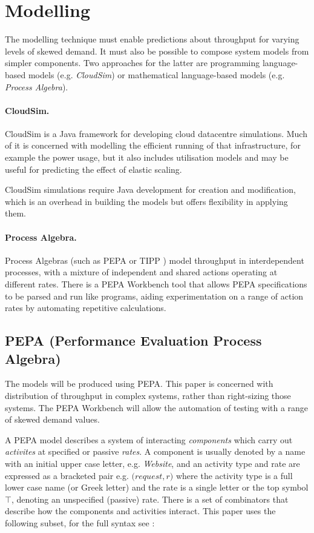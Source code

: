 \section{Modelling}

The modelling technique must enable predictions about throughput for varying levels of skewed demand.  It must also be possible to compose system models from simpler components.  Two approaches for the latter are programming language-based models (e.g. {\itshape CloudSim}) or mathematical language-based models (e.g. {\itshape Process Algebra}).

\paragraph{CloudSim.}  CloudSim \cite{RN69} is a Java framework for developing cloud datacentre simulations.  Much of it is concerned with modelling the efficient running of that infrastructure, for example the power usage, but it also includes utilisation models and may be useful for predicting the effect of elastic scaling.

CloudSim simulations require Java development for creation and modification, which is an overhead in building the models but offers flexibility in applying them.

\paragraph{Process Algebra.} Process Algebras (such as PEPA or TIPP \cite{RN64}) model throughput in interdependent processes, with a mixture of independent and shared actions operating at different rates.  There is a PEPA Workbench tool \cite{RN51} that allows PEPA specifications to be parsed and run like programs, aiding experimentation on a range of action rates by automating repetitive calculations.

\subsection{PEPA (Performance Evaluation Process Algebra)}

The models will be produced using PEPA.  This paper is concerned with distribution of throughput in complex systems, rather than right-sizing those systems.  The PEPA Workbench will allow the automation of testing with a range of skewed demand values.

A PEPA model describes a system of interacting {\itshape components} which carry out {\itshape activites} at specified or passive {\itshape rates}.  A component is usually denoted by a name with an initial upper case letter, e.g. {\itshape Website}, and an activity type and rate are expressed as a bracketed pair e.g. $\mathit(request, r)$ where the activity type is a full lower case name (or Greek letter) and the rate is a single letter or the top symbol $\top$, denoting an unspecified (passive) rate.  There is a set of combinators that describe how the components and activities interact.  This paper uses the following subset, for the full syntax see {\cite{RN1048}}:

